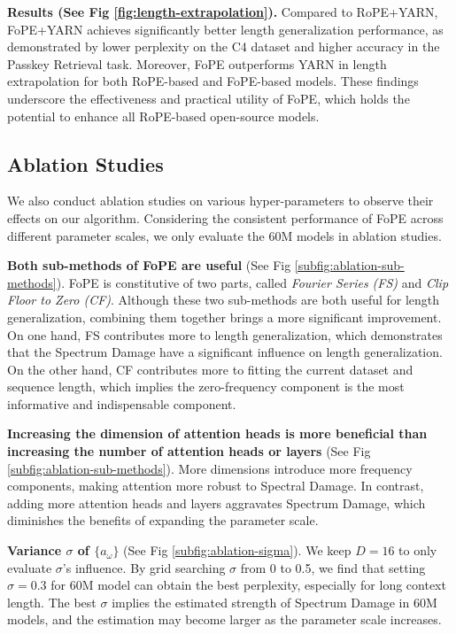 \textbf{Results (See Fig \ref{fig:length-extrapolation}).} Compared to RoPE+YARN, FoPE+YARN achieves significantly better length generalization performance, as demonstrated by lower perplexity on the C4 dataset and higher accuracy in the Passkey Retrieval task. Moreover, FoPE outperforms YARN in length extrapolation for both RoPE-based and FoPE-based models. These findings underscore the effectiveness and practical utility of FoPE, which holds the potential to enhance all RoPE-based open-source models.

\subsection{Ablation Studies}
\label{subsec:ablation}
We also conduct ablation studies on various hyper-parameters to observe their effects on our algorithm.
Considering the consistent performance of FoPE across different parameter scales, we only evaluate the 60M models in ablation studies. 

\textbf{Both sub-methods of FoPE are useful} (See Fig \ref{subfig:ablation-sub-methods}). FoPE is constitutive of two parts, called \textit{Fourier Series (FS)} and \textit{Clip Floor to Zero (CF)}. Although these two sub-methods are both useful for length generalization, combining them together brings a more significant improvement. On one hand, FS contributes more to length generalization, which demonstrates that the Spectrum Damage have a significant influence on length generalization. On the other hand, CF contributes more to fitting the current dataset and sequence length, which implies the zero-frequency component is the most informative and indispensable component.

\textbf{Increasing the dimension of attention heads is more beneficial than increasing the number of attention heads or layers} (See Fig \ref{subfig:ablation-sub-methods}). More dimensions introduce more frequency components, making attention more robust to Spectral Damage. In contrast, adding more attention heads and layers aggravates Spectrum Damage, which diminishes the benefits of expanding the parameter scale.

\textbf{Variance $\sigma$ of $\{a_\omega\}$} (See Fig \ref{subfig:ablation-sigma}). We keep $D=16$ to only evaluate $\sigma$'s influence. By grid searching $\sigma$ from 0 to 0.5, we find that setting $\sigma=0.3$ for 60M model can obtain the best perplexity, especially for long context length. The best $\sigma$ implies the estimated strength of Spectrum Damage in 60M models, and the estimation may become larger as the parameter scale increases.

